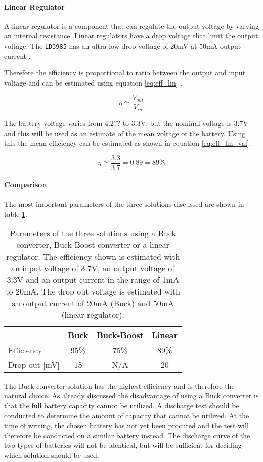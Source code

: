 \paragraph{Linear Regulator}
A linear regulator is a component that can regulate the output voltage by varying an internal resistance.
Linear regulators have a drop voltage that limit the output voltage. 
The \texttt{LD3985} has an ultra low drop voltage of 20mV at 50mA output current \cite{LD3985}.

Therefore the efficiency is proportional to ratio between the output and input voltage and can be estimated using equation \ref{eq:eff_lin} \cite{ap_note_140}.

\begin{equation}
	\eta \simeq \frac{V_{out}}{V_{in}}
	\label{eq:eff_lin}
\end{equation}

The battery voltage varies from 4.2?? to 3.3V, but the nominal voltage is 3.7V and this will be used as an estimate of the mean voltage of the battery.
Using this the mean efficiency can be estimated as shown in equation \ref{eq:eff_lin_val}.

\begin{equation}
	\eta \simeq \frac{3.3}{3.7} = 0.89 = 89\%
	\label{eq:eff_lin_val}
\end{equation}


\paragraph{Comparison}
The most important parameters of the three solutions discussed are shown in table \ref{tab:vol_gen_joint}.

\begin{table}
	\centering
	\begin{tabular}{l|c|c|c}
		  				&	Buck 	& Buck-Boost 	& Linear\\
		 \hline
		 Efficiency  	&  95\% 	& 75\%			&89\%		\\
		 Drop out [mV]		&15  	& N/A		&20		\\
	\end{tabular}
	\caption{Parameters of the three solutions using a Buck converter, Buck-Boost converter or a linear regulator. The efficiency shown is estimated with an input voltage of 3.7V, an output voltage of 3.3V and an output current in the range of 1mA to 20mA. The drop out voltage is estimated with an output current of 20mA (Buck) and 50mA (linear regulator).}
	\label{tab:vol_gen_joint}
\end{table}

The Buck converter solution has the highest efficiency and is therefore the natural choice.
As already discussed the disadvantage of using a Buck converter is that the full battery capacity cannot be utilized.
A discharge test should be conducted to determine the amount of capacity that cannot be utilized.
At the time of writing, the chosen battery has not yet been procured and the test will therefore be conducted on a similar battery instead.
The discharge curve of the two types of batteries will not be identical, but will be sufficient for deciding which solution should be used.

